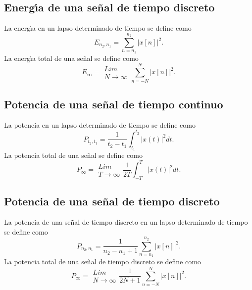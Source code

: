 \subsection{Energ\'{\i}a de una se\~{n}al de tiempo discreto}

La energ\'{\i}a en un lapso determinado de tiempo se define como
\begin{equation}
  E_{n_{2},n_{1}}=\sum_{n=n_{1}}^{n_{2}}\left| x\left[ n\right] \right| ^{2}.
\end{equation}
La energ\'{\i}a total de una se\~{n}al se define como
\begin{equation}
  E_{\infty }= 
  \begin{array}{l}
    Lim \\ 
    N\rightarrow \infty
  \end{array}
  \sum_{n=-N}^{N}\left| x\left[ n\right] \right| ^{2}.
\end{equation}

\subsection{Potencia de una se\~{n}al de tiempo continuo}

La potencia en un lapso determinado de tiempo se define como
\begin{equation}
  P_{t_{2},t_{1}}=\frac{1}{t_{2}-t_{1}}\int_{t_{1}}^{t_{2}}\left| x\left(t\right) \right| ^{2}dt.
\end{equation}
La potencia total de una se\~{n}al se define como
\begin{equation}
  P_{\infty }= 
  \begin{array}{l}
    Lim \\ 
    T\rightarrow \infty
  \end{array}
  \frac{1}{2T}\int_{-T}^{T}\left| x\left( t\right) \right| ^{2}dt.
\end{equation}

\subsection{Potencia de una se\~{n}al de tiempo discreto}

La potencia de una se\~{n}al de tiempo discreto en un lapso
determinado de tiempo se define como
\begin{equation}
  P_{n_{2},n_{1}}=\frac{1}{n_{2}-n_{1}+1}\sum_{n=n_{1}}^{n_{2}}\left| x\left[ n\right] \right| ^{2}.
\end{equation}
La potencia total de una se\~{n}al de tiempo discreto se define como
\begin{equation}
  P_{\infty }= 
  \begin{array}{l}
    Lim \\ 
    N\rightarrow \infty
  \end{array}
  \frac{1}{2N+1}\sum_{n=-N}^{N}\left| x\left[ n\right] \right| ^{2}.
\end{equation}

